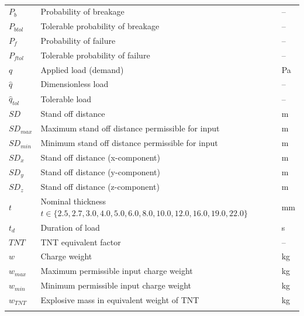\documentclass[12pt]{article}
\begin{document}
\begin{longtabu}{l X[l] l}
${P_{b}}$ & Probability of breakage & --
\\
${P_{btol}}$ & Tolerable probability of breakage & --
\\
${P_{f}}$ & Probability of failure & --
\\
${P_{ftol}}$ & Tolerable probability of failure & --
\\
$q$ & Applied load (demand) & Pa
\\
$\hat{q}$ & Dimensionless load & --
\\
${\hat{q}_{tol}}$ & Tolerable load & --
\\
$SD$ & Stand off distance & m
\\
${SD_{max}}$ & Maximum stand off distance permissible for input & m
\\
${SD_{min}}$ & Minimum stand off distance permissible for input & m
\\
${SD_{x}}$ & Stand off distance (x-component) & m
\\
${SD_{y}}$ & Stand off distance (y-component) & m
\\
${SD_{z}}$ & Stand off distance (z-component) & m
\\
$t$ & Nominal thickness $t\in{}\{2.5,2.7,3.0,4.0,5.0,6.0,8.0,10.0,12.0,16.0,19.0,22.0\}$ & mm
\\
${t_{d}}$ & Duration of load & s
\\
$TNT$ & TNT equivalent factor & --
\\
$w$ & Charge weight & kg
\\
${w_{max}}$ & Maximum permissible input charge weight & kg
\\
${w_{min}}$ & Minimum permissible input charge weight & kg
\\
${w_{TNT}}$ & Explosive mass in equivalent weight of TNT & kg
\\
\bottomrule
\caption{}
\label{Table:ToS}
\end{longtabu}
\end{document}
